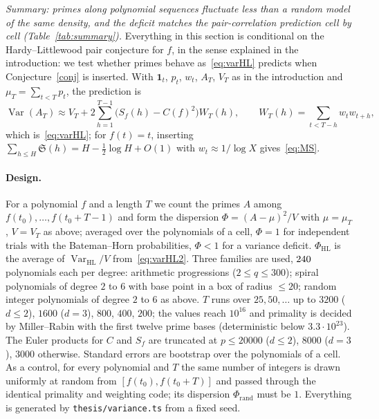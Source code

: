 \documentclass[11pt,a4paper]{article}
\theoremstyle{remark}\newtheorem{remark}[theorem]{Remark}
\newcommand{\Var}{\operatorname{Var}}
\newcommand{\Sig}{\mathfrak S}
\begin{document}
\emph{Summary: primes along polynomial sequences fluctuate less than a random model of the same density,
and the deficit matches the pair-correlation prediction cell by cell (Table~\ref{tab:summary}).}
Everything in this section is conditional on the Hardy--Littlewood pair conjecture for $f$, in the
sense explained in the introduction: we test whether primes behave as~\eqref{eq:varHL} predicts when
Conjecture~\ref{conj} is inserted. With $\mathbf 1_t$, $p_t$, $w_t$, $A_T$, $V_T$ as in the
introduction and $\mu_T=\sum_{t<T}p_t$, the prediction is
\begin{equation}\label{eq:varHL2}
\Var(A_T)\approx V_T+2\sum_{h=1}^{T-1}\bigl(S_f(h)-C(f)^2\bigr)W_T(h),\qquad W_T(h)=\sum_{t<T-h}w_tw_{t+h},
\end{equation}
which is~\eqref{eq:varHL}; for $f(t)=t$, inserting $\sum_{h\le H}\Sig(h)=H-\tfrac12\log H+O(1)$ with
$w_t\approx1/\log X$ gives~\eqref{eq:MS}.

\paragraph{Design.} For a polynomial $f$ and a length $T$ we count the primes $A$ among
$f(t_0),\dots,f(t_0+T-1)$ and form the dispersion $\Phi=(A-\mu)^2/V$ with $\mu=\mu_T$, $V=V_T$ as
above; averaged over the polynomials of a cell, $\Phi=1$ for independent trials with the
Bateman--Horn probabilities, $\Phi<1$ for a variance deficit. $\Phi_{\mathrm{HL}}$ is the average of
$\Var_{\mathrm{HL}}/V$ from~\eqref{eq:varHL2}. Three families are used, $240$ polynomials each per
degree: arithmetic progressions ($2\le q\le300$); spiral polynomials of degree $2$ to $6$ with base
point in a box of radius $\le20$; random integer polynomials of degree $2$ to $6$ as above. $T$ runs
over $25,50,\dots$ up to $3200$ ($d\le2$), $1600$ ($d=3$), $800$, $400$, $200$; the values reach
$10^{16}$ and primality is decided by Miller--Rabin with the first twelve prime bases (deterministic
below $3.3\cdot10^{23}$). The Euler products for $C$ and $S_f$ are truncated at $p\le20000$
($d\le2$), $8000$ ($d=3$), $3000$ otherwise. Standard errors are bootstrap over the polynomials of a
cell. As a control, for every polynomial and $T$ the same number of integers is drawn uniformly at random
from $[f(t_0),f(t_0+T)]$ and passed through the identical primality and weighting code; its dispersion
$\Phi_{\mathrm{rand}}$ must be $1$. Everything is generated by \texttt{thesis/variance.ts} from a fixed
seed.
\end{document}
